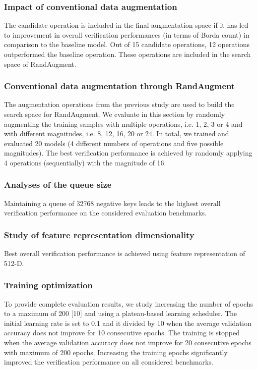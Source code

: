\documentclass[12pt]{article}
\begin{document}
\subsubsection{Impact of conventional data augmentation}
The candidate operation is included in the final augmentation space if it
has led to improvement in overall verification performances
(in terms of Borda count) in comparison to the baseline
model. Out of 15 candidate operations, 12 operations outperformed the baseline operation. These operations are included
in the search space of RandAugment.
\subsubsection{Conventional data augmentation through RandAugment}
The augmentation operations from the previous study are used to build the search space for
RandAugment. We evaluate in this section by randomly
augmenting the training samples with multiple operations,
i.e. 1, 2, 3 or 4 and with different magnitudes, i.e. 8,
12, 16, 20 or 24. In total, we trained and evaluated 20
models (4 different numbers of operations and five possible
magnitudes). The best verification performance is achieved
by randomly applying 4 operations (sequentially) with the
magnitude of 16.
\subsubsection{Analyses of the queue size}
Maintaining a queue of 32768 negative keys leads to the highest overall
verification performance on the considered evaluation benchmarks. 
\subsubsection{Study of feature representation dimensionality}
Best overall verification performance is achieved using feature
representation of 512-D.
\subsubsection{Training optimization}
To provide complete evaluation results, we
study increasing the number of epochs to a maximum of
200 [10] and using a plateau-based learning scheduler. The
initial learning rate is set to 0.1 and it divided by 10 when
the average validation accuracy does not improve for 10
consecutive epochs. The training is stopped when the average
validation accuracy does not improve for 20 consecutive
epochs with maximum of 200 epochs. Increasing the training epochs
significantly improved the verification performance on all
considered benchmarks.
\end{document}
